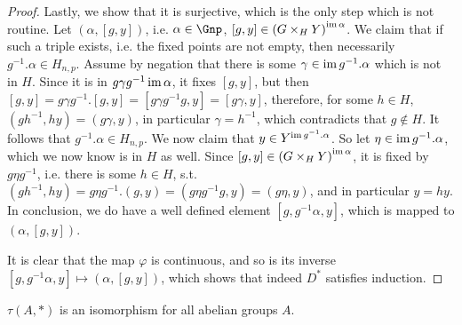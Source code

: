 \begin{proof}
	Lastly, we show that it is surjective, which is the only step which is not routine.
	Let $\left(\alpha, \left[g, y\right]\right)$, i.e. $\alpha \in \Gnp$, $\left[g, y\right] \in \left(G \times_H Y\right)^{\operatorname{im} \alpha}$.
	We claim that if such a triple exists, i.e. the fixed points are not empty, then necessarily $g^{-1}. \alpha \in H_{n,p}$.
	Assume by negation that there is some $\gamma \in \operatorname{im} g^{-1}. \alpha$ which is not in $H$.
	Since it is in $g \gamma g^{-1} \operatorname{im} \alpha$, it fixes $\left[g, y\right]$, but then
	$
	\left[g, y\right]
	= g \gamma g^{-1}. \left[g, y\right]
	= \left[g \gamma g^{-1} g, y\right]
	= \left[g \gamma, y\right]
	$,
	therefore, for some $h \in H$,
	$\left(gh^{-1}, hy\right)= \left(g \gamma, y\right)$,
	in particular $\gamma = h^{-1}$, which contradicts that $g \notin H$.
	It follows that $g^{-1}. \alpha \in H_{n,p}$.
	We now claim that $y \in Y^{\operatorname{im} g^{-1}. \alpha}$.
	So let $\eta \in \operatorname{im} g^{-1}. \alpha$, which we now know is in $H$ as well.
	Since $\left[g, y\right] \in \left(G \times_H Y\right)^{\operatorname{im} \alpha}$, it is fixed by $g \eta g^{-1}$, i.e. there is some $h \in H$, s.t.
	$
	\left(gh^{-1}, hy\right)
	= g \eta g^{-1}. \left(g, y\right)
	= \left(g \eta g^{-1} g, y\right)
	= \left(g \eta, y\right)
	$,
	and in particular $y = hy$.
	In conclusion, we do have a well defined element $\left[g, g^{-1} \alpha, y\right]$, which is mapped to $\left(\alpha, \left[g, y\right]\right)$.
	
	It is clear that the map $\varphi$ is continuous, and so is its inverse $\left[g, g^{-1} \alpha, y\right] \mapsto \left(\alpha, \left[g, y\right]\right)$, which shows that indeed $D^*$ satisfies induction.
\end{proof}

\begin{lemma}
	$\tau\left(A, *\right)$ is an isomorphism for all abelian groups $A$.
\end{lemma}

